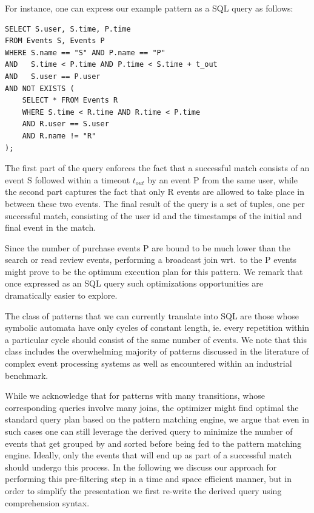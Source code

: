 For instance, one can express our example pattern as a SQL query as follows:
\begin{verbatim}
SELECT S.user, S.time, P.time
FROM Events S, Events P
WHERE S.name == "S" AND P.name == "P"  
AND   S.time < P.time AND P.time < S.time + t_out
AND   S.user == P.user
AND NOT EXISTS ( 
    SELECT * FROM Events R
    WHERE S.time < R.time AND R.time < P.time
    AND R.user == S.user
    AND R.name != "R"
); 
\end{verbatim}

The first part of the query enforces the fact that a successful match consists
of an event S followed within a timeout $t_{out}$ by an event P from the same user,
while the second part captures the fact that only R events are allowed to take
place in between these two events.
The final result of the query is a set of tuples, one per successful match,
consisting of the user id and the timestamps of the initial and final event
in the match.

Since the number of purchase events P are bound to be much lower than the
search or read review events, performing a broadcast join wrt.\ to the P events
might prove to be the optimum execution plan for this pattern. We remark that
once expressed as an SQL query such optimizations opportunities are dramatically
easier to explore.



The class of patterns that we can currently translate into SQL are those whose
symbolic automata have only cycles of constant length, ie. every repetition
within a particular cycle should consist of the same number of events. 
We note that this class includes the overwhelming majority of patterns discussed
in the literature of complex event processing systems as well as encountered
within an industrial benchmark.

While we acknowledge that for patterns with many transitions, whose
corresponding queries involve many joins, the optimizer might find optimal the
standard query plan based on the pattern matching engine,
we argue that even in such cases one can still leverage the derived query to
minimize the number of events that get grouped by and sorted before being fed to
the pattern matching engine.
Ideally, only the events that will end up as part of a successful match should
undergo this process.
In the following we discuss our approach for performing this pre-filtering step
in a time and space efficient manner, but in order to simplify the presentation
we first re-write the derived query using comprehension syntax.

